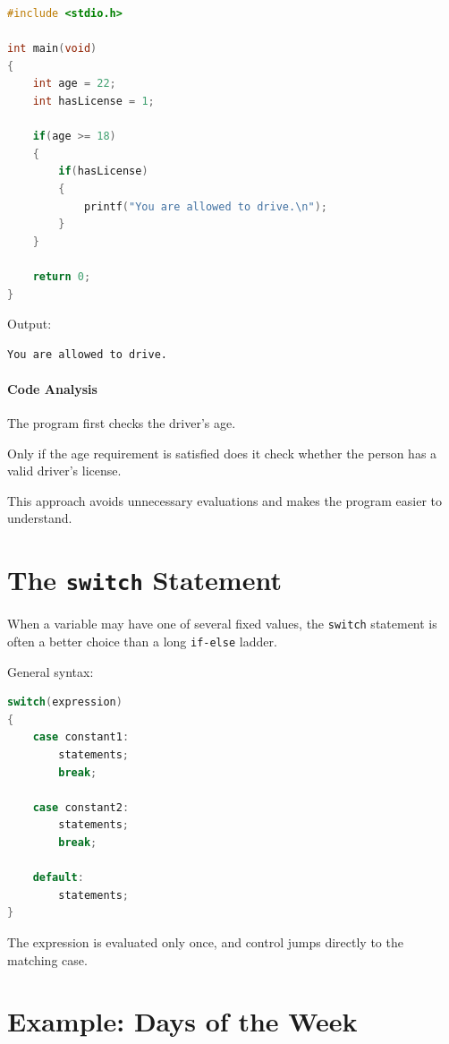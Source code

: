\documentclass[12pt,openany]{book}
\begin{document}
\begin{lstlisting}[language=C]
#include <stdio.h>

int main(void)
{
    int age = 22;
    int hasLicense = 1;

    if(age >= 18)
    {
        if(hasLicense)
        {
            printf("You are allowed to drive.\n");
        }
    }

    return 0;
}
\end{lstlisting}

Output:

\begin{lstlisting}
You are allowed to drive.
\end{lstlisting}

\paragraph{Code Analysis}

The program first checks the driver's age.

Only if the age requirement is satisfied does it check whether the person has a valid driver's license.

This approach avoids unnecessary evaluations and makes the program easier to understand.

\section{The \texttt{switch} Statement}

When a variable may have one of several fixed values, the \texttt{switch} statement is often a better choice than a long \texttt{if-else} ladder.

General syntax:

\begin{lstlisting}[language=C]
switch(expression)
{
    case constant1:
        statements;
        break;

    case constant2:
        statements;
        break;

    default:
        statements;
}
\end{lstlisting}

The expression is evaluated only once, and control jumps directly to the matching case.

\section{Example: Days of the Week}
\end{document}
